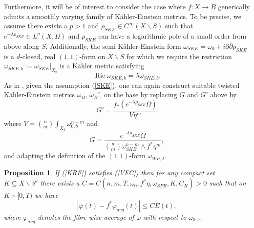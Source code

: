 \documentclass[12pt]{article}
\newtheorem{proposition}[theorem]{Proposition}
\numberwithin{equation}{section}
\renewcommand{\d}{\partial}
\newcommand{\dbar}{\overline{\partial}}
\DeclareMathOperator{\Ric}{Ric}
\begin{document}
\noindent Furthermore, it will be of interest to consider the case where $f: X \to B$ generically admits a smoothly varying family of K\"ahler-Einstein metrics. To be precise, we assume there exists a $p > 1$ and $\rho_{SKE} \in C^{\infty}(X\backslash S)$ such that $e^{-\lambda \rho_{SKE}} \in L^p(X,\Omega)$ and $\rho_{SKE}$ can have a logarithmic pole of a small order from above along $S$. Additionally, the semi K\"ahler-Einstein form $\omega_{SKE} = \omega_0 + i\d\dbar \rho_{SKE}$ is a $d$-closed, real $(1,1)$-form on $X \backslash S$ for which we require the restriction $\omega_{SKE,b} := \omega_{SKE}|_{X_b}$ is a K\"ahler metric satisfying
\begin{equation}\tag{SKE}\label{SKE}
    \Ric \omega_{SKE,b} = \lambda \omega_{SKE,b}.
\end{equation}
As in \cite{B25II}, given the assumption (\ref{SKE}), one can again construct suitable twisted K\"ahler-Einstein metrics $\omega_B$, $\omega_B'$, on the base by replacing $G$ and $G'$ above by
\begin{equation*}
    G' = \frac{f_*( e^{-\lambda \rho_{SKE}}\Omega)}{V \eta^m}
\end{equation*}
where $V = {n \choose m} \int_{X_b} \omega_{0,b}^{n-m}$ and
\begin{equation*}
    G = \frac{e^{-\lambda \rho_{SKE}}\Omega}{{n\choose m} \omega_{SKE}^{n-m} \wedge f^*\eta^m},
\end{equation*}
and adapting the definition of the $(1,1)$-form $\omega_{WP,\lambda}$.

\begin{proposition}\label{potential_convergence}
If (\ref{KRF}) satisfies (\ref{VFC}) then for any compact set $K \subseteq X \backslash S'$ there exists a $C = C(n,m,T,\omega_0,f^*\eta, \omega_{SPR},K, C_{K})> 0$ such that on $K \times [0,T)$ we have
\begin{equation*}
    |\varphi(t) - f^*\varphi_{avg}(t)| \leq CE(t),
\end{equation*}
where $\varphi_{avg}$ denotes the fibre-wise average of $\varphi$ with respect to $\omega_{0,b}$.
\end{proposition}
\end{document}
